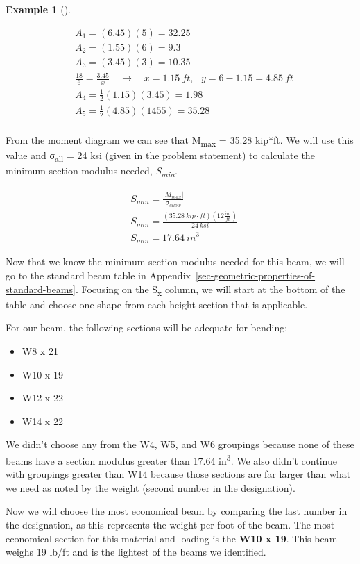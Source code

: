 \documentclass[
  letterpaper,
  DIV=11,
  numbers=noendperiod]{scrreprt}
\theoremstyle{definition}
\newtheorem{example}{Example}[chapter]
\theoremstyle{remark}
\begin{document}
\begin{tcolorbox}
\begin{example}[]
\begin{tcolorbox}
\[
\begin{aligned}
& A_1=(6.45)(5)=32.25 \\
& A_2=(1.55)(6)=9.3 \\
& A_3=(3.45)(3)=10.35 \\
& \frac{18}{6}=\frac{3.45}{x} \quad\rightarrow\quad x=1.15{~ft,}~~~y=6-1.15=4.85 {~ft} \\
& A_4=\frac{1}{2}(1.15)(3.45)=1.98 \\
& A_5=\frac{1}{2}(4.85)(1455)=35.28 \\
&
\end{aligned}
\]

From the moment diagram we can see that
\textbar M\textsubscript{max}\textbar{} = 35.28 kip*ft. We will use this
value and σ\textsubscript{all} = 24 ksi (given in the problem statement)
to calculate the minimum section modulus needed,
\emph{S\textsubscript{min}}.

\[
\begin{aligned}
& S_{min}=\frac{|M_{max}|}{\sigma_{allow}} \\
& S_{min}=\frac{(35.28{~kip}\cdot{ft})(12\frac{in.}{ft})}{24{~ksi}} \\
& S_{min}=17.64{~in}^3
\end{aligned}
\]

Now that we know the minimum section modulus needed for this beam, we
will go to the standard beam table in
Appendix~\ref{sec-geometric-properties-of-standard-beams}. Focusing on
the S\textsubscript{x} column, we will start at the bottom of the table
and choose one shape from each height section that is applicable.

For our beam, the following sections will be adequate for bending:

\begin{itemize}
\item
  W8 x 21
\item
  W10 x 19
\item
  W12 x 22
\item
  W14 x 22
\end{itemize}

We didn't choose any from the W4, W5, and W6 groupings because none of
these beams have a section modulus greater than 17.64
in\textsuperscript{3}. We also didn't continue with groupings greater
than W14 because those sections are far larger than what we need as
noted by the weight (second number in the designation).

Now we will choose the most economical beam by comparing the last number
in the designation, as this represents the weight per foot of the beam.
The most economical section for this material and loading is the
\textbf{W10 x 19}. This beam weighs 19 lb/ft and is the lightest of the
beams we identified.

\end{tcolorbox}

\end{example}

\end{tcolorbox}
\end{document}
